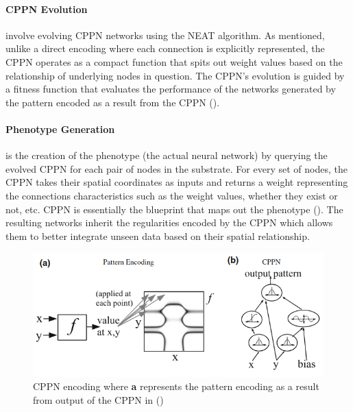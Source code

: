 \parbreak\noindent \paragraph{CPPN Evolution} involve evolving CPPN networks using the NEAT algorithm. As mentioned, unlike a direct encoding where each connection is explicitly represented, the CPPN operates as a compact function that spits out weight values based on the relationship of underlying nodes in question. The CPPN's evolution is guided by a fitness function that evaluates the performance of the networks generated by the pattern encoded as a result from the CPPN (\cite{stanley2009hypercube}).

\parbreak\noindent \paragraph{Phenotype Generation} is the creation of the phenotype (the actual neural network) by querying the evolved CPPN for each pair of nodes in the substrate. For every set of nodes, the CPPN takes their spatial coordinates as inputs and returns a weight  representing the connections characteristics such as the weight values, whether they exist or not, etc. CPPN is essentially the blueprint that maps out the phenotype (\cite{stanley2009hypercube}). The resulting networks inherit the regularities encoded by the CPPN which allows them to better integrate unseen data based on their spatial relationship.

\parbreak
\begin{figure}[H] %
	\centering %
	\includegraphics[width=\textwidth]{Figures/chapter_ne/ne_hyperneat_cppn.png} %
	\caption{CPPN encoding where \textbf{a} represents the pattern encoding as a result from output of the CPPN in  (\cite{d2014hyperneat})}
	\label{fig:ne_hyperneat_cppn} %
\end{figure}

